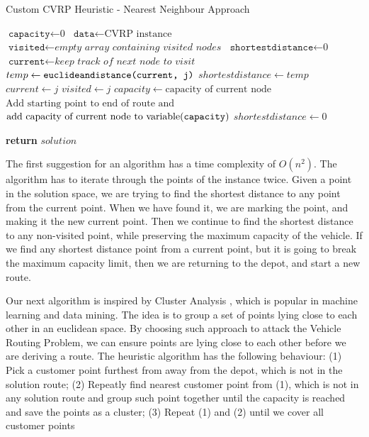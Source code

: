 \documentclass[12pt]{article}
\newcommand{\var}{\texttt}
\begin{document}
\begin{algorithm}
	\caption{Custom CVRP Heuristic - Nearest Neighbour Approach}\label{euclid}
	\begin{algorithmic}[1]
	\State $\var{capacity} \gets \text{0}$
	\State $\var{data} \gets \text{CVRP instance}$
	\State $\var{visited} \gets \textit{empty array containing visited nodes}$
	\State $\var{shortestdistance} \gets \textit{0}$
	\State $\var{current} \gets \textit{keep track of next node to visit}$
	\For{\texttt{$\var{i} \gets 0$ to $\text{length of data-1}$}}
		\For{\texttt{$\var{j} \gets 1$ to $\text{length of data}$}}
			\State $temp \gets \var{euclideandistance(\var{current}, \var{j})}$
					\State $shortestdistance \gets temp$
					\State $current \gets j$
					\State $visited \gets j$
					\newline{}
						\State $capacity \gets \text{capacity of current node}$					
					\Else
						\State $\text{Add starting point to end of route and}$
						\State $\text{add capacity of current node to variable(\var{capacity})}$
					\EndIf
				\EndIf
			\EndIf
		\EndFor
		\State $shortestdistance \gets 0$ 
	\EndFor

	\State \textbf{return} $solution$
	\EndFunction
	\end{algorithmic}
\end{algorithm}

The first suggestion for an algorithm has a time complexity of $O(n^2)$. The algorithm has to iterate through the points of the instance twice. 
Given a point in the solution space, we are trying to find the shortest distance to any point from the current point. When we have found it, we are marking the point,
and making it the new current point. Then we continue to find the shortest distance to any non-visited point, while preserving the maximum capacity of the vehicle. 
If we find any shortest distance point from a current point, but it is going to break the maximum capacity limit, then we are returning to the depot, and start a new route.
\newline

Our next algorithm is inspired by Cluster Analysis \cite{website:cluster-analysis}, which is popular in machine learning and data mining. 
The idea is to group a set of points lying close to each other in an euclidean space. 
By choosing such approach to attack the Vehicle Routing Problem, we can ensure points are lying close to each other before we are deriving a route.
\newline
The heuristic algorithm has the following behaviour: (1) Pick a customer point furthest from away from the depot, which is not in the solution route;
(2) Repeatly find nearest customer point from (1), which is not in any solution route and group such point together until the capacity is reached and save the points as a cluster; (3) Repeat (1) and (2) until we cover all customer points
\end{document}
